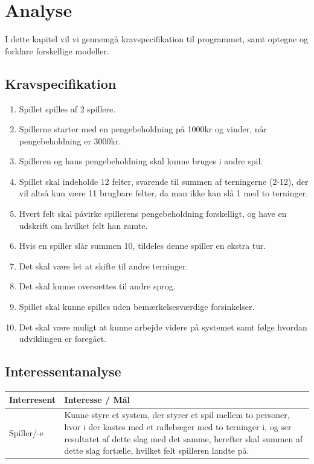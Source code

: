\chapter{Analyse}

I dette kapitel vil vi gennemgå kravspecifikation til programmet, samt optegne og forklare forskellige modeller.


\section{Kravspecifikation}
\label{sec:requirements}

\begin{enumerate}
    \item Spillet spilles af 2 spillere.
    \item Spillerne starter med en pengebeholdning på 1000kr og vinder, når pengebeholdning er 3000kr.
    \item Spilleren og hans pengebeholdning skal kunne bruges i andre spil.
    \item Spillet skal indeholde 12 felter, svarende til summen af terningerne (2-12), der vil altså kun være 11 brugbare felter, da man ikke kan slå 1 med to terninger.
    \item Hvert felt skal påvirke spillerens pengebeholdning forskelligt, og have en udskrift om hvilket felt han ramte.
    \item Hvis en spiller slår summen 10, tildeles denne spiller en ekstra tur.
    \item Det skal være let at skifte til andre terninger.
    \item Det skal kunne oversættes til andre sprog.
    \item Spillet skal kunne spilles uden bemærkelsesværdige forsinkelser.
    \item Det skal være muligt at kunne arbejde videre på systemet samt følge hvordan udviklingen er foregået.
    \\
\end{enumerate}

\pagebreak



\section{Interessentanalyse}
\begin{center}
    \begin{tabular}{ | l | p{13cm} |}
    \hline
    \textbf{Interresent} & \textbf{Interesse / Mål} \\ \hline
    Spiller/-e & Kunne styre et system, der styrer et spil mellem to personer, 
    hvor i der kastes med et raflebæger med to terninger i, og ser resultatet af dette slag med det samme, herefter skal summen af dette slag fortælle, hvilket felt spilleren landte på.\\ \hline
    \hline
    \end{tabular}
\end{center}

